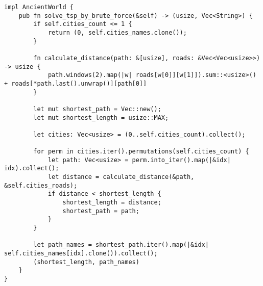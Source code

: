 \begin{center}
\captionsetup{justification=raggedright,singlelinecheck=off}
\begin{lstlisting}[label=lst:brute_force,caption=алгоритм полного перебора]
impl AncientWorld {
    pub fn solve_tsp_by_brute_force(&self) -> (usize, Vec<String>) {
        if self.cities_count <= 1 {
            return (0, self.cities_names.clone());
        }

        fn calculate_distance(path: &[usize], roads: &Vec<Vec<usize>>) -> usize {
            path.windows(2).map(|w| roads[w[0]][w[1]]).sum::<usize>() + roads[*path.last().unwrap()][path[0]]
        }

        let mut shortest_path = Vec::new();
        let mut shortest_length = usize::MAX;

        let cities: Vec<usize> = (0..self.cities_count).collect();

        for perm in cities.iter().permutations(self.cities_count) {
            let path: Vec<usize> = perm.into_iter().map(|&idx| idx).collect();
            let distance = calculate_distance(&path, &self.cities_roads);
            if distance < shortest_length {
                shortest_length = distance;
                shortest_path = path;
            }
        }

        let path_names = shortest_path.iter().map(|&idx| self.cities_names[idx].clone()).collect();
        (shortest_length, path_names)
    }
}
\end{lstlisting}
\end{center}


